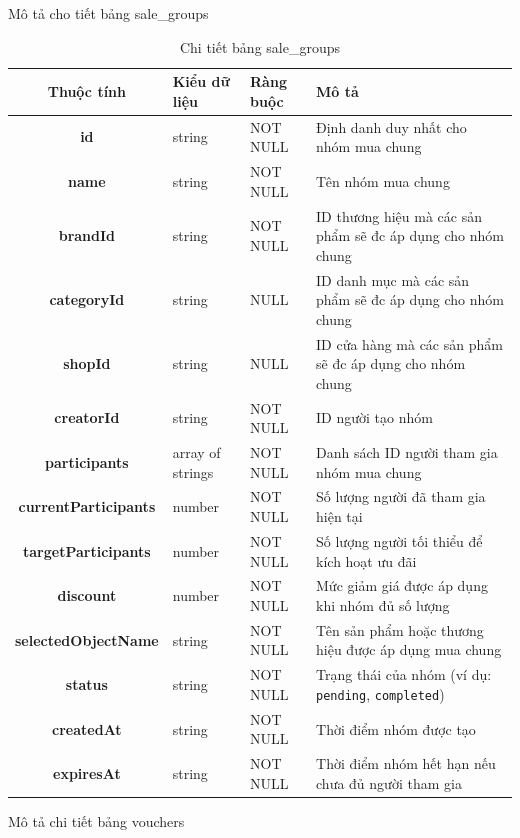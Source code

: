 \documentclass[../DoAn.tex]{subfiles}
\begin{document}
Mô tả cho tiết bảng sale\_groups
\begin{table}[H]
\centering
\begin{tabular}{|c|p{1.5cm}|l|p{7cm}|}
\hline
\textbf{Thuộc tính} & \textbf{Kiểu dữ liệu} & \textbf{Ràng buộc} & \textbf{Mô tả} \\ \hline
\textbf{id} & string & NOT NULL & Định danh duy nhất cho nhóm mua chung \\ \hline
\textbf{name} & string & NOT NULL & Tên nhóm mua chung \\ \hline
\textbf{brandId} & string & NOT NULL & ID thương hiệu mà các sản phẩm sẽ đc áp dụng cho nhóm chung \\ \hline
\textbf{categoryId} & string & NULL & ID danh mục  mà các sản phẩm sẽ đc áp dụng cho nhóm chung \\ \hline
\textbf{shopId} & string & NULL & ID cửa hàng  mà các sản phẩm sẽ đc áp dụng cho nhóm chung \\ \hline
\textbf{creatorId} & string & NOT NULL & ID người tạo nhóm \\ \hline
\textbf{participants} & array of strings & NOT NULL & Danh sách ID người tham gia nhóm mua chung \\ \hline
\textbf{currentParticipants} & number & NOT NULL & Số lượng người đã tham gia hiện tại \\ \hline
\textbf{targetParticipants} & number & NOT NULL & Số lượng người tối thiểu để kích hoạt ưu đãi \\ \hline
\textbf{discount} & number & NOT NULL & Mức giảm giá được áp dụng khi nhóm đủ số lượng \\ \hline
\textbf{selectedObjectName} & string & NOT NULL & Tên sản phẩm hoặc thương hiệu được áp dụng mua chung \\ \hline
\textbf{status} & string & NOT NULL & Trạng thái của nhóm (ví dụ: \texttt{pending}, \texttt{completed}) \\ \hline
\textbf{createdAt} & string & NOT NULL & Thời điểm nhóm được tạo \\ \hline
\textbf{expiresAt} & string & NOT NULL & Thời điểm nhóm hết hạn nếu chưa đủ người tham gia \\ \hline
\end{tabular}
\caption{Chi tiết bảng sale\_groups}
\label{tab:sale_groupsTable}
\end{table}
\FloatBarrier   
Mô tả chi tiết bảng vouchers
\end{document}
